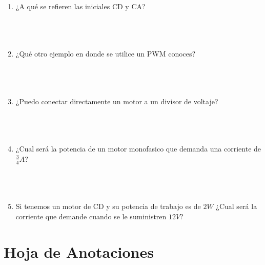 	\begin{enumerate}
		\item ¿A qué se refieren las iniciales CD y CA?\\ \\ \\ \\
		\item ¿Qué otro ejemplo en donde se utilice un PWM conoces?\\ \\ \\ \\
		\item ¿Puedo conectar directamente un motor a un divisor de voltaje?\\ \\ \\ \\
		\item ¿Cual será la potencia de un motor monofasico que demanda una corriente de $\frac{3}{4} A$?\\ \\ \\ \\
		\item Si tenemos un motor de CD y su potencia de trabajo es de $2 W$ ¿Cual será la corriente que demande cuando se le suministren $12 V$?\\
	\end{enumerate}


\clearpage
\section{Hoja de Anotaciones}

